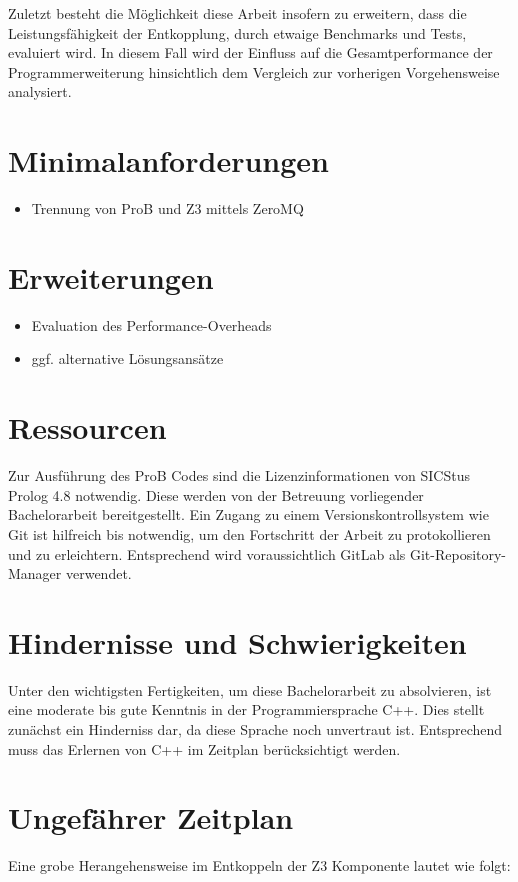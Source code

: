 \documentclass[11pt,a4paper]{scrartcl}
\begin{document}
Zuletzt besteht die Möglichkeit diese Arbeit insofern zu erweitern, dass die Leistungsfähigkeit der Entkopplung, durch etwaige Benchmarks und Tests, evaluiert wird.
In diesem Fall wird der Einfluss auf die Gesamtperformance der Programmerweiterung hinsichtlich dem Vergleich zur vorherigen Vorgehensweise analysiert.
\section{Minimalanforderungen}
\begin{itemize}
    \item Trennung von ProB und Z3 mittels ZeroMQ
\end{itemize}

\section{Erweiterungen}
\begin{itemize}
    \item Evaluation des Performance-Overheads
    \item ggf. alternative Lösungsansätze
\end{itemize}

\section{Ressourcen}
Zur Ausführung des ProB Codes sind die Lizenzinformationen von SICStus Prolog 4.8 notwendig.
Diese werden von der Betreuung vorliegender Bachelorarbeit bereitgestellt.
Ein Zugang zu einem Versionskontrollsystem wie Git ist hilfreich bis notwendig, um den Fortschritt der Arbeit zu protokollieren und zu erleichtern.
Entsprechend wird voraussichtlich GitLab als Git-Repository-Manager verwendet.

\section{Hindernisse und Schwierigkeiten}
Unter den wichtigsten Fertigkeiten, um diese Bachelorarbeit zu absolvieren, ist eine moderate bis gute Kenntnis in der Programmiersprache C++.
Dies stellt zunächst ein Hinderniss dar, da diese Sprache noch unvertraut ist. Entsprechend muss das Erlernen von C++ im Zeitplan berücksichtigt werden.

\section{Ungefährer Zeitplan}
Eine grobe Herangehensweise im Entkoppeln der Z3 Komponente lautet wie folgt:
\end{document}
